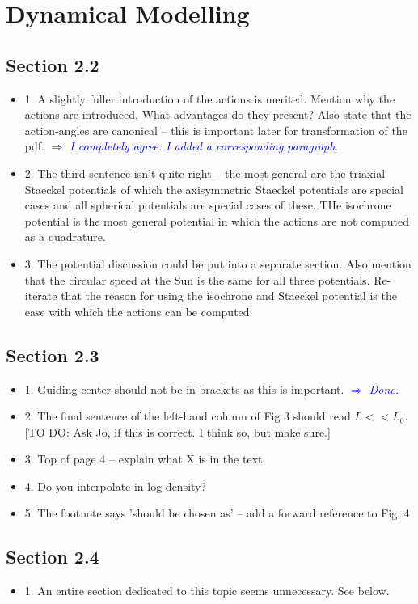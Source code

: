 \documentclass[10pt,a4paper]{article}
\newcommand{\Comment}[1]{\textsl{\textcolor{Blue}{$\Longrightarrow$ {#1}}}}
\newcommand{\Jo}[1]{\textcolor{YellowOrange}{#1}}
\begin{document}
\section{Dynamical Modelling}

\subsection{Section 2.2}
\begin{itemize}
\item 1. A slightly fuller introduction of the actions is merited. Mention why the actions are introduced. What advantages do they present? Also state that the action-angles are canonical -- this is important later for transformation of the pdf. \Comment{I completely agree. I added a corresponding paragraph.}
\item 2. The third sentence isn't quite right -- the most general are the triaxial
Staeckel potentials of which the axisymmetric Staeckel potentials are special cases
and all spherical potentials are special cases of these. THe isochrone potential is
the most general potential in which the actions are not computed as a quadrature.
\item 3. The potential discussion could be put into a separate section. Also mention that the circular speed at the Sun is the same for all three potentials. Re-iterate that the reason for using the isochrone and Staeckel potential is the ease with which the actions can be computed.
\end{itemize}

\subsection{Section 2.3}
\begin{itemize}
\item 1. Guiding-center should not be in brackets as this is important. \Comment{Done.}
\item 2. The final sentence of the left-hand column of Fig 3 should read $L<<L_0$. \Jo{[TO DO: Ask Jo, if this is correct. I think so, but make sure.]}
\item 3. Top of page 4 -- explain what X is in the text.
\item 4. Do you interpolate in log density?
\item 5. The footnote says 'should be chosen as' -- add a forward reference to Fig. 4
\end{itemize}

\subsection{Section 2.4}
\begin{itemize}
\item 1. An entire section dedicated to this topic seems unnecessary. See below.
\end{itemize}
\end{document}
